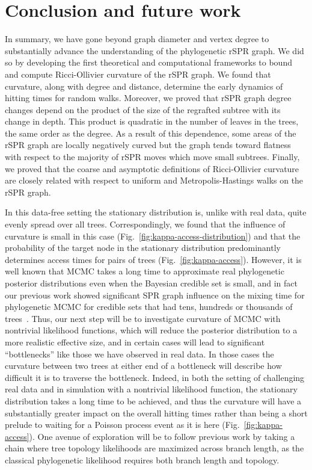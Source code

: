 \documentclass[]{elsarticle}
\begin{document}
\section{Conclusion and future work}
In summary, we have gone beyond graph diameter and vertex degree to substantially advance the understanding of the phylogenetic rSPR graph.
We did so by developing the first theoretical and computational frameworks to bound and compute Ricci-Ollivier curvature of the rSPR graph.
We found that curvature, along with degree and distance, determine the early dynamics of hitting times for random walks.
Moreover, we proved that rSPR graph degree changes depend on the product of the size of the regrafted subtree with its change in depth.
This product is quadratic in the number of leaves in the trees, the same order as the degree.
As a result of this dependence, some areas of the rSPR graph are locally negatively curved but the graph tends toward flatness with respect to the majority of rSPR moves which move small subtrees.
Finally, we proved that the coarse and asymptotic definitions of Ricci-Ollivier curvature are closely related with respect to uniform and Metropolis-Hastings walks on the rSPR graph.


In this data-free setting the stationary distribution is, unlike with real data, quite evenly spread over all trees.
Correspondingly, we found that the influence of curvature is small in this case (Fig.~\ref{fig:kappa-access-distribution}) and that the probability of the target node in the stationary distribution predominantly determines access times for pairs of trees (Fig.~\ref{fig:kappa-access}).
However, it is well known that MCMC takes a long time to approximate real phylogenetic posterior distributions even when the Bayesian credible set is small, and in fact our previous work showed significant SPR graph influence on the mixing time for phylogenetic MCMC for credible sets that had tens, hundreds or thousands of trees~\citep{Whidden2015-yi}.
Thus, our next step will be to investigate curvature of MCMC with nontrivial likelihood functions, which will reduce the posterior distribution to a more realistic effective size, and in certain cases will lead to significant ``bottlenecks'' like those we have observed in real data.
In those cases the curvature between two trees at either end of a bottleneck will describe how difficult it is to traverse the bottleneck.
Indeed, in both the setting of challenging real data and in simulation with a nontrivial likelihood function, the stationary distribution takes a long time to be achieved, and thus the curvature will have a substantially greater impact on the overall hitting times rather than being a short prelude to waiting for a Poisson process event as it is here (Fig.~\ref{fig:kappa-access}).
One avenue of exploration will be to follow previous work \citep{Stefankovic2011-hu} by taking a chain where tree topology likelihoods are maximized across branch length, as the classical phylogenetic likelihood \citep{felsenstein1981evolutionary} requires both branch length and topology.
\end{document}
